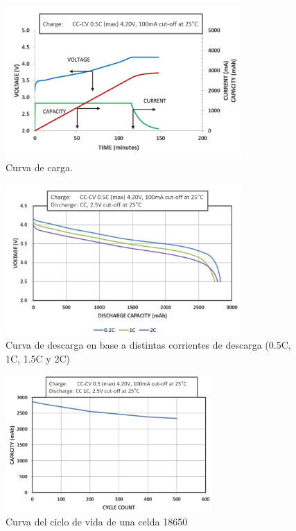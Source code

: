 \documentclass[10pt,a4paper]{article}
\begin{document}
    \clearpage
	
	\begin{figure}[h!]
		\begin{center}
			\includegraphics[width=0.8\textwidth]{cc_cv_18650.png}
			\caption{Curva de carga.}
			\label{cc_cv}
		\end{center}
	\end{figure}
	
	\begin{figure}[h!]
		\begin{center}
			\includegraphics[width=0.8\textwidth]{discharge_18650.png}
			\caption{Curva de descarga en base a distintas corrientes de descarga (0.5C, 1C, 1.5C y 2C)}
			\label{descarga_18650}
		\end{center}
	\end{figure}

    \clearpage
	
	\begin{figure}[h!]
		\begin{center}
			\includegraphics[width=0.7\textwidth]{life_cycle_18650.png}
			\caption{Curva del ciclo de vida de una celda 18650}
			\label{life_cycle_18650}
		\end{center}
	\end{figure}
	
\end{document}
